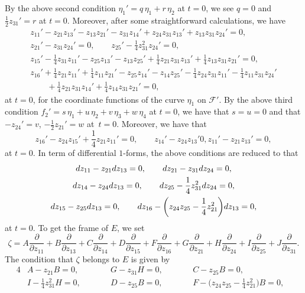 \documentclass[11pt]{article}
\numberwithin{equation}{section}
\numberwithin{equation}{section}
\theoremstyle{definition}
\newcommand{\0}{\boldsymbol{0}}
\newcommand{\pa}{\partial}
\begin{document}
By the above second condition
$\eta_1' = q\,\eta_1 + r\,\eta_2$ at $t = 0$, we see $q = 0$ and $\frac{1}{2}z_{31}' = r$ at $t = 0$.
Moreover, after some straightforward calculations, we have
\begin{gather*}
z_{11}' - z_{21}z_{13}' - z_{13}z_{21}' - z_{31}z_{14}' + z_{24}z_{31}z_{13}' + z_{13}z_{31}z_{24}' = 0,
\\
z_{21}' - z_{31}z_{24}' = 0, \qquad z_{25}' - \frac{1}{4}z_{31}^2z_{24}' = 0,
\\
z_{15}' - \frac{1}{4}z_{31}z_{11}' - z_{25}z_{13}' - z_{13}z_{25}' + \frac{1}{4}z_{21}z_{31}z_{13}' +
\frac{1}{4}z_{13}z_{31}z_{21}' = 0,
\\
z_{16}' + \frac{1}{4}z_{21}z_{11}' + \frac{1}{4}z_{11}z_{21}' - z_{25}z_{14}' - z_{14}z_{25}' - \frac{1}{4}z_{24}z_{31}z_{11}' -
\frac{1}{4}z_{11}z_{31}z_{24}' \\
\qquad{} + \frac{1}{4}z_{21}z_{31}z_{14}' + \frac{1}{4}z_{14}z_{31}z_{21}' = 0,
\end{gather*}
at $t = 0$, for the coordinate functions of the curve $\eta_1$ on ${\mathcal F}'$.
By the above third condition
$f_2' = s\,\eta_1 + u\,\eta_2 + v\,\eta_3 + w\,\eta_4$ at $t = 0$, we have that
$s = u = 0$ and that $-z_{24}' = v$, $- \frac{1}{2}z_{21}' = w$ at~$t = 0$.
Moreover, we have that
\[
z_{16}' - z_{24}z_{15}' + \frac{1}{4}z_{21}z_{11}' = 0, \qquad z_{14}' - z_{24}z_{13}' 0, z_{11}' - z_{21}z_{13}' = 0,
\]
at $t = 0$.
In term of differential $1$-forms, the above conditions are reduced to that
\begin{gather*}
{\rm d}z_{11} - z_{21}{\rm d}z_{13} = 0, \qquad {\rm d}z_{21} - z_{31}{\rm d}z_{24} = 0, \\ {\rm d}z_{14} - z_{24}{\rm d}z_{13} = 0, \qquad
{\rm d}z_{25} - \frac{1}{4}z_{31}^2{\rm d}z_{24} = 0,
\\
{\rm d}z_{15} - z_{25}{\rm d}z_{13} = 0, \qquad {\rm d}z_{16} - \biggl(z_{24}z_{25} - \frac{1}{4}z_{21}^2\biggr){\rm d}z_{13} = 0,
\end{gather*}
at $t = 0$.
To get the frame of $E$, we set
\[
\zeta = A\frac{\pa}{\pa z_{11}} + B\frac{\pa}{\pa z_{13}} + C\frac{\pa}{\pa z_{14}} + D\frac{\pa}{\pa z_{15}} +
F\frac{\pa}{\pa z_{16}} + G\frac{\pa}{\pa z_{21}} + H\frac{\pa}{\pa z_{24}} + I\frac{\pa}{\pa z_{25}} + J\frac{\pa}{\pa z_{31}}.
\]
The condition that $\zeta$ belongs to $E$ is given by
\begin{alignat*}{4}
&A - z_{21}B = 0, \qquad&& G - z_{31}H = 0, \qquad&& C - z_{25}B = 0,& \\
&I - \frac{1}{4}z_{31}^2H = 0, \qquad&& D - z_{25}B = 0, \qquad&&
F - \biggl(z_{24}z_{25} - \frac{1}{4}z_{21}^2\biggr)B = 0,&
\end{alignat*}
\end{document}
